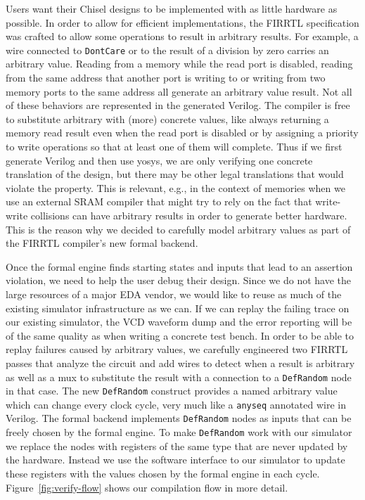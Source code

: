 \documentclass[conference]{IEEEtran}
\newcommand\scalainline[1]{\texttt{#1}}
\begin{document}
Users want their Chisel designs to be implemented with as little hardware as possible.
In order to allow for efficient implementations, the FIRRTL specification was crafted to allow
some operations to result in arbitrary results.
For example, a wire connected to \scalainline{DontCare} or to the result of a division by zero carries an arbitrary value.
Reading from a memory while the read port is disabled, reading from the same address that another port is writing to or
writing from two memory ports to the same address all generate an arbitrary value result.
Not all of these behaviors are represented in the generated Verilog.
The compiler is free to substitute arbitrary with (more) concrete values, like always returning a memory read result even
when the read port is disabled or by assigning a priority to write operations so that at least one of them will complete.
Thus if we first generate Verilog and then use yosys, we are only verifying one concrete translation of the design,
but there may be other legal translations that would violate the property.
This is relevant, e.g., in the context of memories when we use an external SRAM compiler that might try to
rely on the fact that write-write collisions can have arbitrary results in order to generate better hardware.
This is the reason why we decided to carefully model arbitrary values as part of the FIRRTL compiler's new formal backend.

Once the formal engine finds starting states and inputs that lead to an assertion violation, we need to help the user debug their design.
Since we do not have the large resources of a major EDA vendor, we would like to reuse as much of the existing simulator infrastructure as we can.
If we can replay the failing trace on our existing simulator, the VCD waveform dump and the error reporting will be of the same quality as
when writing a concrete test bench.
In order to be able to replay failures caused by arbitrary values, we carefully engineered two FIRRTL passes that analyze the circuit and
add wires to detect when a result is arbitrary as well as a mux to substitute the result with a connection to a \scalainline{DefRandom} node in that case.
The new \scalainline{DefRandom} construct provides a named arbitrary value which can change every clock cycle,
very much like a \scalainline{anyseq} annotated wire in Verilog.
The formal backend implements \scalainline{DefRandom} nodes as inputs that can be freely chosen by the formal engine.
To make \scalainline{DefRandom} work with our simulator we  replace the nodes with registers of the same type that are never updated by the hardware.
Instead we use the software interface to our simulator to update these registers with the values chosen by the formal engine in each cycle.
Figure~\ref{fig:verify-flow} shows our compilation flow in more detail.
\end{document}
